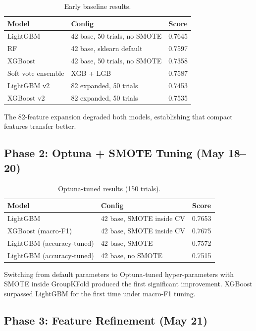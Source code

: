 \documentclass[12pt, a4paper]{article}
\begin{document}
\begin{table}[h]
\centering
\caption{Early baseline results.}
\label{tab:phase1}
\begin{tabular}{@{}llc@{}}
\toprule
\textbf{Model} & \textbf{Config} & \textbf{Score} \\ \midrule
LightGBM & 42 base, 50 trials, no SMOTE & 0.7645 \\
RF & 42 base, sklearn default & 0.7597 \\
XGBoost & 42 base, 50 trials, no SMOTE & 0.7358 \\
Soft vote ensemble & XGB + LGB & 0.7587 \\
LightGBM v2 & 82 expanded, 50 trials & 0.7453 \\
XGBoost v2 & 82 expanded, 50 trials & 0.7535 \\ \bottomrule
\end{tabular}
\end{table}

The 82-feature expansion degraded both models, establishing that compact features transfer better.

\subsection{Phase 2: Optuna + SMOTE Tuning (May 18--20)}

\begin{table}[h]
\centering
\caption{Optuna-tuned results (150 trials).}
\label{tab:phase2}
\begin{tabular}{@{}llc@{}}
\toprule
\textbf{Model} & \textbf{Config} & \textbf{Score} \\ \midrule
LightGBM & 42 base, SMOTE inside CV & 0.7653 \\
XGBoost (macro-F1) & 42 base, SMOTE inside CV & 0.7675 \\
LightGBM (accuracy-tuned) & 42 base, SMOTE & 0.7572 \\
LightGBM (accuracy-tuned) & 42 base, no SMOTE & 0.7515 \\ \bottomrule
\end{tabular}
\end{table}

Switching from default parameters to Optuna-tuned hyper-parameters with SMOTE inside GroupKFold produced the first significant improvement. XGBoost surpassed LightGBM for the first time under macro-F1 tuning.

\subsection{Phase 3: Feature Refinement (May 21)}
\end{document}
